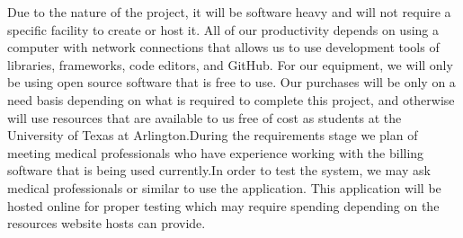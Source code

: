 
Due to the nature of the project, it will be software heavy and will not require a specific facility to create or host it. All of our productivity depends on using a computer with network connections that allows us to use development tools of libraries, frameworks, code editors, and GitHub. For our equipment, we will only be using open source software that is free to use. Our purchases will be only on a need basis depending on what is required to complete this project, and otherwise will use resources that are available to us free of cost as students at the University of Texas at Arlington.During the requirements stage we plan of meeting medical professionals who have experience working with the billing software that is being used currently.In order to test the system, we may ask medical professionals or similar to use the application. This application will be hosted online for proper testing which may require spending depending on the resources website hosts can provide.